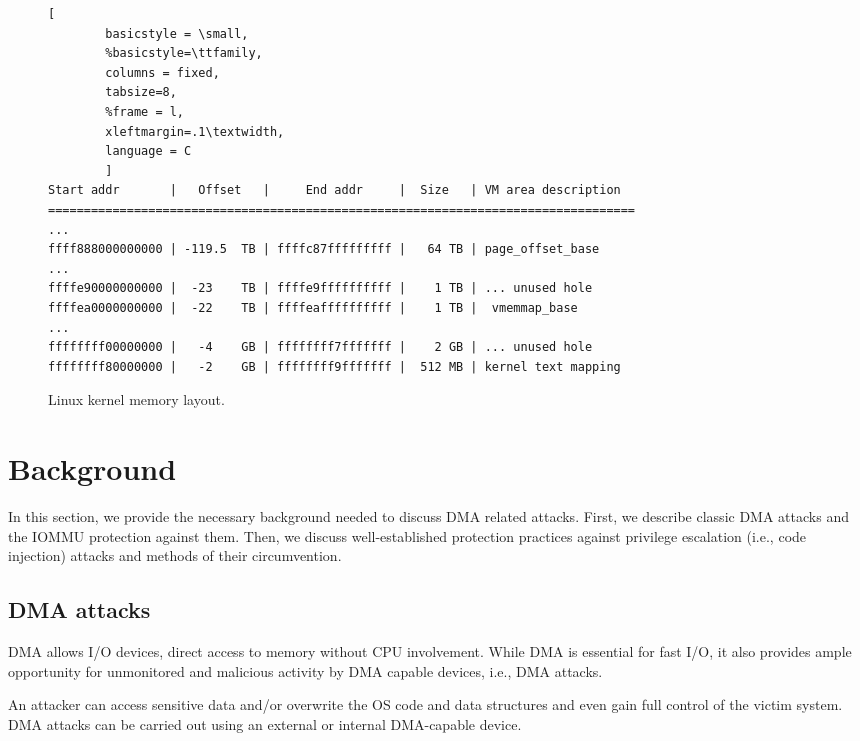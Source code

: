 \begin{figure*}[t]

        \begin{lstlisting}[
        basicstyle = \small,
        %basicstyle=\ttfamily,
        columns = fixed,
        tabsize=8,
        %frame = l,
        xleftmargin=.1\textwidth,
        language = C
        ]
Start addr       |   Offset   |     End addr     |  Size   | VM area description
==================================================================================
...
ffff888000000000 | -119.5  TB | ffffc87fffffffff |   64 TB | page_offset_base
...
ffffe90000000000 |  -23    TB | ffffe9ffffffffff |    1 TB | ... unused hole
ffffea0000000000 |  -22    TB | ffffeaffffffffff |    1 TB |  vmemmap_base
...
ffffffff00000000 |   -4    GB | ffffffff7fffffff |    2 GB | ... unused hole
ffffffff80000000 |   -2    GB | ffffffff9fffffff |  512 MB | kernel text mapping
                \end{lstlisting}
        \caption{ Linux kernel memory layout.}
        \label{fig:mem_layot}

\end{figure*}

\section{Background}\label{sec:background}

In this section, we provide the necessary background needed to discuss DMA related attacks. First, we describe classic DMA attacks and the IOMMU protection against them. Then, we discuss well-established protection practices against privilege escalation (i.e., code injection) attacks and methods of their circumvention.

\subsection{DMA attacks}

DMA allows I/O devices, direct access to memory \cite{oC54} without CPU involvement. While DMA is essential for fast I/O, it also provides ample opportunity for unmonitored and malicious activity by DMA capable devices, i.e., DMA attacks. 

An attacker can access sensitive data and/or overwrite the OS code and data structures and even gain full control of the victim system. DMA attacks can be carried out using an external or internal DMA-capable device. 

